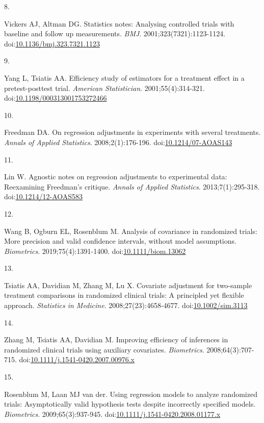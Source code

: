 \documentclass[
  11pt,
]{article}
\newlength{\cslhangindent}
\newlength{\csllabelwidth}
\newenvironment{CSLReferences}[2] %
 {\begin{list}{}{%
  \setlength{\itemindent}{0pt}
  \setlength{\leftmargin}{0pt}
  \setlength{\parsep}{0pt}
  \ifodd #1
   \setlength{\leftmargin}{\cslhangindent}
   \setlength{\itemindent}{-1\cslhangindent}
  \fi
  \setlength{\itemsep}{#2\baselineskip}}}
 {\end{list}}
\newcommand{\CSLLeftMargin}[1]{\parbox[t]{\csllabelwidth}{\strut#1\strut}}
\newcommand{\CSLRightInline}[1]{\parbox[t]{\linewidth - \csllabelwidth}{\strut#1\strut}}
\begin{document}
\begin{CSLReferences}{0}{1}
\CSLLeftMargin{8. }%
\CSLRightInline{Vickers AJ, Altman DG. Statistics notes: Analysing controlled trials with baseline and follow up measurements. \emph{BMJ}. 2001;323(7321):1123-1124. doi:\href{https://doi.org/10.1136/bmj.323.7321.1123}{10.1136/bmj.323.7321.1123}}

\CSLLeftMargin{9. }%
\CSLRightInline{Yang L, Tsiatis AA. Efficiency study of estimators for a treatment effect in a pretest-posttest trial. \emph{American Statistician}. 2001;55(4):314-321. doi:\href{https://doi.org/10.1198/000313001753272466}{10.1198/000313001753272466}}

\CSLLeftMargin{10. }%
\CSLRightInline{Freedman DA. On regression adjustments in experiments with several treatments. \emph{Annals of Applied Statistics}. 2008;2(1):176-196. doi:\href{https://doi.org/10.1214/07-AOAS143}{10.1214/07-AOAS143}}

\CSLLeftMargin{11. }%
\CSLRightInline{Lin W. Agnostic notes on regression adjustments to experimental data: Reexamining {Freedman}'s critique. \emph{Annals of Applied Statistics}. 2013;7(1):295-318. doi:\href{https://doi.org/10.1214/12-AOAS583}{10.1214/12-AOAS583}}

\CSLLeftMargin{12. }%
\CSLRightInline{Wang B, Ogburn EL, Rosenblum M. Analysis of covariance in randomized trials: More precision and valid confidence intervals, without model assumptions. \emph{Biometrics}. 2019;75(4):1391-1400. doi:\href{https://doi.org/10.1111/biom.13062}{10.1111/biom.13062}}

\CSLLeftMargin{13. }%
\CSLRightInline{Tsiatis AA, Davidian M, Zhang M, Lu X. Covariate adjustment for two-sample treatment comparisons in randomized clinical trials: A principled yet flexible approach. \emph{Statistics in Medicine}. 2008;27(23):4658-4677. doi:\href{https://doi.org/10.1002/sim.3113}{10.1002/sim.3113}}

\CSLLeftMargin{14. }%
\CSLRightInline{Zhang M, Tsiatis AA, Davidian M. Improving efficiency of inferences in randomized clinical trials using auxiliary covariates. \emph{Biometrics}. 2008;64(3):707-715. doi:\href{https://doi.org/10.1111/j.1541-0420.2007.00976.x}{10.1111/j.1541-0420.2007.00976.x}}

\CSLLeftMargin{15. }%
\CSLRightInline{Rosenblum M, Laan MJ van der. Using regression models to analyze randomized trials: Asymptotically valid hypothesis tests despite incorrectly specified models. \emph{Biometrics}. 2009;65(3):937-945. doi:\href{https://doi.org/10.1111/j.1541-0420.2008.01177.x}{10.1111/j.1541-0420.2008.01177.x}}


\end{CSLReferences}
\end{document}
